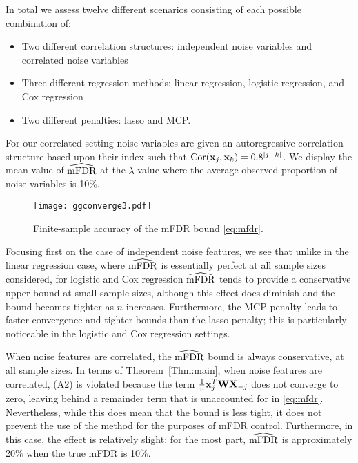 In total we assess twelve different scenarios consisting of each possible combination of:
\begin{itemize}
\item Two different correlation structures: independent noise variables and correlated noise variables
\item Three different regression methods: linear regression, logistic regression, and Cox regression
\item Two different penalties: lasso and MCP. 
\end{itemize}
For our correlated setting noise variables are given an autoregressive correlation structure based upon their index such that $\textrm{Cor}(\mathbf{x}_j,\mathbf{x}_k) = 0.8^{|j - k|}$. We display the mean value of $\widehat{\textrm{mFDR}}$ at the $\lambda$ value where the average observed proportion of noise variables is 10\%.

\begin{figure} [!htb]
 \centering
  \texttt{[image: ggconverge3.pdf]}
  \caption{Finite-sample accuracy of the mFDR bound \eqref{eq:mfdr}.}
\end{figure}

Focusing first on the case of independent noise features, we see that unlike in the linear regression case, where $\widehat{\textrm{mFDR}}$ is essentially perfect at all sample sizes considered, for logistic and Cox regression $\widehat{\textrm{mFDR}}$ tends to provide a conservative upper bound at small sample sizes, although this effect does diminish and the bound becomes tighter as $n$ increases.
Furthermore, the MCP penalty leads to faster convergence and tighter bounds than the lasso penalty; this is particularly noticeable in the logistic and Cox regression settings.

When noise features are correlated, the $\widehat{\textrm{mFDR}}$ bound is always conservative, at all sample sizes.  In terms of Theorem~\ref{Thm:main}, when noise features are correlated, (A2) is violated because the term $\frac{1}{n}\mathbf{x}_j^T\mathbf{W}\mathbf{X}_{-j}$ does not converge to zero, leaving behind a remainder term that is unaccounted for in \eqref{eq:mfdr}.
Nevertheless, while this does mean that the bound is less tight, it does not prevent the use of the method for the purposes of mFDR control.
Furthermore, in this case, the effect is relatively slight: for the most part, $\widehat{\textrm{mFDR}}$ is approximately 20\% when the true mFDR is 10\%.

